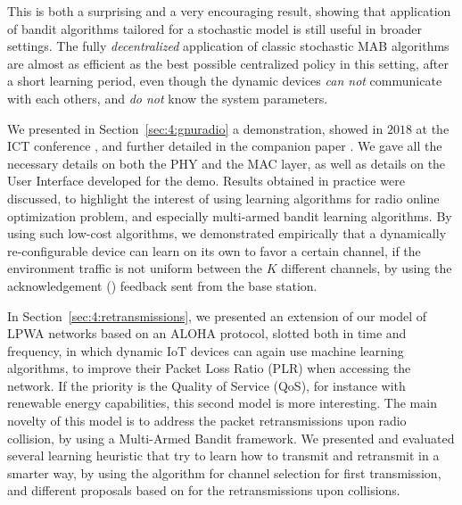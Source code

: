 This is both a surprising and a very encouraging result, showing that application of bandit algorithms tailored for a stochastic model is still useful in broader settings.
The fully \emph{decentralized} application of classic stochastic MAB algorithms are almost as efficient as the best possible centralized policy in this setting, after a short learning period, even though the dynamic devices \emph{can not} communicate with each others, and \emph{do not} know the system parameters.


\label{sub:42:conclusionFromDemonstration}

We presented in Section~\ref{sec:4:gnuradio} a demonstration, showed in $2018$ at the ICT conference \cite{Besson2018ICT}, and further detailed in the companion paper \cite{Besson2019WCNC}.
We gave all the necessary details on both the PHY and the MAC layer, as well as details on the User Interface developed for the demo.
Results obtained in practice were discussed, to highlight the interest of using learning algorithms for radio online optimization problem, and especially multi-armed bandit learning algorithms.
%
By using such low-cost algorithms, we demonstrated empirically that a dynamically re-configurable device can learn on its own to favor a certain channel, if the environment traffic is not uniform between the $K$ different channels, by using the acknowledgement (\Ack) feedback sent from the base station.


\label{sub:43:conclusion}

In Section~\ref{sec:4:retransmissions}, we presented an extension of our model of LPWA networks based on an ALOHA protocol, slotted both in time and frequency, in which dynamic IoT devices can again use machine learning algorithms, to improve their Packet Loss Ratio (PLR) when accessing the network.
If the priority is the Quality of Service (QoS), for instance with renewable energy capabilities, this second model is more interesting.
The main novelty of this model is to address the packet retransmissions upon radio collision, by using a Multi-Armed Bandit framework.
We presented and evaluated several learning heuristic that try to learn how to transmit and retransmit in a smarter way, by using the \UCB{} algorithm for channel selection for first transmission, and different proposals based on \UCB{} for the retransmissions upon collisions.

